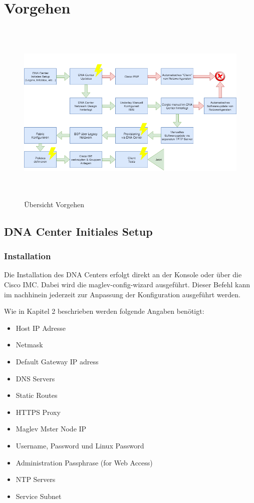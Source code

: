 \section{Vorgehen}

\begin{figure}[H]
	\centering
	\includegraphics[height=9cm]{img/vorgehen.png}
	\caption{Übersicht Vorgehen}
	\label{fig:vorgehen}
\end{figure} 

\subsection{DNA Center Initiales Setup}

\subsubsection{Installation}
\label{DNACenterSetup_Installation}
Die Installation des DNA Centers erfolgt direkt an der Konsole oder über die Cisco IMC. Dabei wird die maglev-config-wizard ausgeführt. Dieser Befehl kann im nachhinein jederzeit zur Anpassung der Konfiguration ausgeführt werden. 

Wie in \cite{cisco-dna-installation-guide} Kapitel 2 beschrieben werden folgende Angaben benötigt:
\begin{itemize}
	\item Host IP Adresse
	\item Netmask
	\item Default Gateway IP adress
	\item DNS Servers
	\item Static Routes
	\item HTTPS Proxy
	\item Maglev Mster Node IP
	\item Username, Password und Linux Password
	\item Administration Passphrase (for Web Access)
	\item NTP Servers
	\item Service Subnet
\end{itemize}

